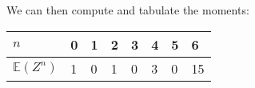 \documentclass[twocolumn]{article}
\newcommand{\ev}[1]{\mathbb{E}(#1)}
\begin{document}
We can then compute and tabulate the moments:
\begin{table}[h]
\centering
\begin{tabular}{@{}llllllll@{}}
\toprule
$n$   & 0 & 1 & 2 & 3 & 4 & 5 & 6  \\ \midrule
$\ev{Z^n}$ & 1 & 0 & 1 & 0 & 3 & 0 & 15 \\ \bottomrule
\end{tabular}
\end{table}
\end{document}
